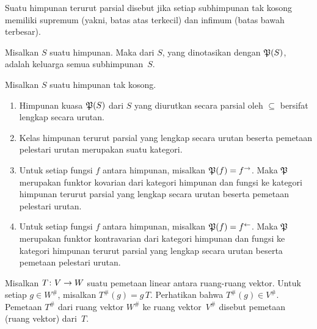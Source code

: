 \begin{defn} Suatu himpunan terurut parsial disebut
 jika setiap subhimpunan tak kosong memiliki supremum (yakni, batas atas
terkecil) dan infimum (batas bawah terbesar).
\end{defn}

\begin{defn} Misalkan $S$ suatu himpunan. Maka
 dari $S$, yang dinotasikan dengan $\mathfrak{P}(S)$, adalah keluarga semua subhimpunan~$S$.
\end{defn}

\begin{exam} Misalkan $S$ suatu himpunan tak kosong.
 \begin{enumerate}
  \item Himpunan kuasa $\mathfrak{P}(S)$ dari $S$ yang diurutkan secara parsial oleh $\subseteq$
bersifat lengkap secara urutan.
  \item Kelas himpunan terurut parsial yang lengkap secara urutan beserta pemetaan
pelestari urutan merupakan suatu kategori.
  \item Untuk setiap fungsi $f$ antara himpunan, misalkan $\mathfrak{P}(f) = f^{\rightarrow}$. Maka
$\mathfrak{P}$ merupakan funktor kovarian dari kategori himpunan dan fungsi ke kategori
himpunan terurut parsial yang lengkap secara urutan beserta pemetaan pelestari urutan.
  \item Untuk setiap fungsi $f$ antara himpunan, misalkan $\mathfrak{P}(f) = f^{\gets}$. Maka
$\mathfrak{P}$ merupakan funktor kontravarian dari kategori himpunan dan fungsi ke kategori
himpunan terurut parsial yang lengkap secara urutan beserta pemetaan pelestari urutan.
 \end{enumerate}
\end{exam}

\begin{defn}\label{defn_vsp_adjoint} Misalkan $T\colon V \rightarrow W$ suatu pemetaan linear antara ruang-ruang vektor. Untuk setiap
$g \in W^{\#}$, misalkan $T^{\#}(g) = g\,T$. Perhatikan bahwa $T^{\#}(g) \in V^{\#}$. Pemetaan $T^{\#}$ dari ruang
vektor $W^{\#}$ ke ruang vektor~$V^{\#}$ disebut pemetaan
 (ruang vektor) dari~$T$.
\end{defn}

